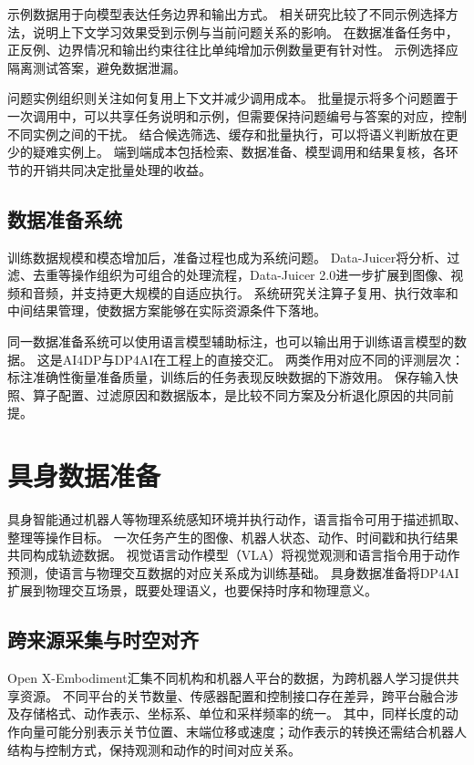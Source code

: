 示例数据用于向模型表达任务边界和输出方式。
相关研究比较了不同示例选择方法，说明上下文学习效果受到示例与当前问题关系的影响。\cite{demonstrations}
在数据准备任务中，正反例、边界情况和输出约束往往比单纯增加示例数量更有针对性。
示例选择应隔离测试答案，避免数据泄漏。

问题实例组织则关注如何复用上下文并减少调用成本。
批量提示将多个问题置于一次调用中，可以共享任务说明和示例，但需要保持问题编号与答案的对应，控制不同实例之间的干扰。\cite{icl_er}
结合候选筛选、缓存和批量执行，可以将语义判断放在更少的疑难实例上。
端到端成本包括检索、数据准备、模型调用和结果复核，各环节的开销共同决定批量处理的收益。

\subsection{数据准备系统}

训练数据规模和模态增加后，准备过程也成为系统问题。
Data-Juicer将分析、过滤、去重等操作组织为可组合的处理流程，Data-Juicer 2.0进一步扩展到图像、视频和音频，并支持更大规模的自适应执行。\cite{datajuicer,datajuicer2}
系统研究关注算子复用、执行效率和中间结果管理，使数据方案能够在实际资源条件下落地。

同一数据准备系统可以使用语言模型辅助标注，也可以输出用于训练语言模型的数据。
这是AI4DP与DP4AI在工程上的直接交汇。
两类作用对应不同的评测层次：标注准确性衡量准备质量，训练后的任务表现反映数据的下游效用。
保存输入快照、算子配置、过滤原因和数据版本，是比较不同方案及分析退化原因的共同前提。

\section{具身数据准备}

具身智能通过机器人等物理系统感知环境并执行动作，语言指令可用于描述抓取、整理等操作目标。
一次任务产生的图像、机器人状态、动作、时间戳和执行结果共同构成轨迹数据。
视觉语言动作模型（VLA）将视觉观测和语言指令用于动作预测，使语言与物理交互数据的对应关系成为训练基础。
具身数据准备将DP4AI扩展到物理交互场景，既要处理语义，也要保持时序和物理意义。

\subsection{跨来源采集与时空对齐}

Open X-Embodiment汇集不同机构和机器人平台的数据，为跨机器人学习提供共享资源。\cite{oxe}
不同平台的关节数量、传感器配置和控制接口存在差异，跨平台融合涉及存储格式、动作表示、坐标系、单位和采样频率的统一。
其中，同样长度的动作向量可能分别表示关节位置、末端位移或速度；动作表示的转换还需结合机器人结构与控制方式，保持观测和动作的时间对应关系。

